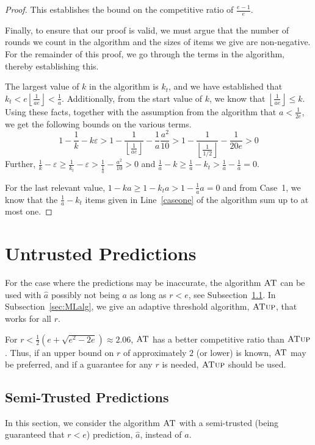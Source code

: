 \documentclass[a4paper,UKenglish,cleveref, autoref, thm-restate]{lipics-v2021}
\newcommand{\ADB}{\ensuremath{\operatorname{\textsc{AT}}}\xspace}
\newcommand{\MLB}{\ensuremath{\operatorname{\textsc{ATup}}}\xspace}
\newcommand{\FLOOR}[1]{\left\lfloor#1\right\rfloor}
\newcommand{\eps}{\ensuremath{\varepsilon}}
\newcommand{\guess}{\ensuremath{\hat{a}}\xspace}
\newcommand{\kfinal}{\ensuremath{k_t}\xspace}
\begin{document}
\begin{proof}
This establishes the bound on the competitive ratio of $\frac{e-1}{e}$.

Finally, to ensure that our proof is valid, we must argue that the
number of rounds we count in the algorithm and the sizes of items we
give are non-negative. For the remainder of this proof, we go through the terms in the algorithm,
thereby establishing this.

The largest value of $k$ in the algorithm is $\kfinal$, and we have
established that $\kfinal<e\FLOOR{\frac{1}{ae}}<\frac{1}{a}$.  Additionally,
from the start value of $k$, we know that
$\FLOOR{\frac{1}{ae}}\leq k$. Using these facts, together with the
assumption from the algorithm that $a<\frac{1}{2e}$, we get the
following bounds on the various terms.
\[
  1-\frac{1}{k}-k\eps
  > 1-\frac{1}{\FLOOR{\frac{1}{ae}}}-\frac{1}{a}\frac{a^2}{10}
  > 1-\frac{1}{\FLOOR{\frac{1}{1/2}}}-\frac{1}{20e}
  > 0
\]
Further, $\frac{1}{k}-\eps\geq\frac{1}{\kfinal}-\eps>\frac{1}{\frac{1}{a}}-\frac{a^2}{10}>0$ and $\frac{1}{a}-k\geq \frac{1}{a}-\kfinal>\frac{1}{a}-\frac{1}{a}=0$.

For the last relevant value, $1-ka\geq 1-\kfinal a>1-\frac{1}{a}a=0$ and from Case~1, we know
that the $\frac{1}{a}-\kfinal$ items given in Line~\ref{caseone} of the
algorithm sum up to at most one.
\end{proof}



\section{Untrusted Predictions}

For the case where the predictions may be inaccurate, the algorithm \ADB
can be used with \guess possibly not being $a$ as long as $r < e$, see
Subsection~\ref{sec:semitrusted}.
In Subsection~\ref{sec:MLalg}, we give an adaptive threshold
algorithm, \MLB, that works for all $r$.

For $r < \frac12(e+\sqrt{e^2-2e}) \approx 2.06$,
\ADB has a better competitive ratio than \MLB.
Thus, if an upper bound on $r$ of approximately $2$ (or lower) is known,
\ADB may be preferred, and if a
guarantee for any $r$ is needed, \MLB should
be used.

\subsection{Semi-Trusted Predictions}
\label{sec:semitrusted}

In this section, we consider the algorithm \ADB with a semi-trusted
(being guaranteed that $r<e$) prediction, \guess, instead of $a$.
\end{document}

